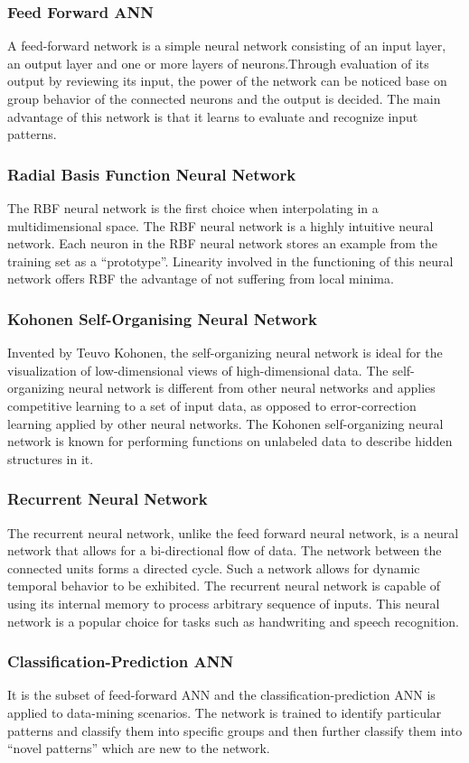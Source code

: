 \subsubsection{Feed Forward ANN}
A feed-forward network is a simple neural network consisting of an input layer, an output layer and one or more layers of neurons.Through evaluation of its output by reviewing its input, the power of the network can be noticed base on group behavior of the connected neurons and the output is decided. The main advantage of this network is that it learns to evaluate and recognize input patterns.
\subsubsection{Radial Basis Function Neural Network}
The RBF neural network is the first choice when interpolating in a multidimensional space. The RBF neural network is a highly intuitive neural network. Each neuron in the RBF neural network stores an example from the training set as a “prototype”. Linearity involved in the functioning of this neural network offers RBF the advantage of not suffering from local minima.
\subsubsection{Kohonen Self-Organising Neural Network}
Invented by Teuvo Kohonen, the self-organizing neural network is ideal for the visualization of low-dimensional views of high-dimensional data. The self-organizing neural network is different from other neural networks and applies competitive learning to a set of input data, as opposed to error-correction learning applied by other neural networks. The Kohonen self-organizing neural network is known for performing functions on unlabeled data to describe hidden structures in it.
\subsubsection{Recurrent Neural Network}
The recurrent neural network, unlike the feed forward neural network, is a neural network that allows for a bi-directional flow of data. The network between the connected units forms a directed cycle. Such a network allows for dynamic temporal behavior to be exhibited. The recurrent neural network is capable of using its internal memory to process arbitrary sequence of inputs. This neural network is a popular choice for tasks such as handwriting and speech recognition.
\subsubsection{Classification-Prediction ANN}
It is the subset of feed-forward ANN and the classification-prediction ANN is applied to data-mining scenarios. The network is trained to identify particular patterns and classify them into specific groups and then further classify them into “novel patterns” which are new to the network.
